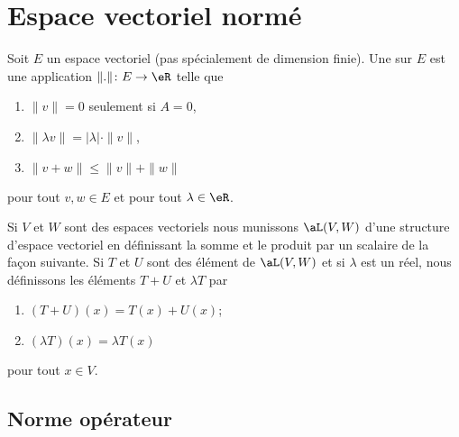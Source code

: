 
\section{Espace vectoriel normé}
\label{SeckwyQjK}

\begin{definition}  \label{DefOYPooZIoWnI}
    Soit \( E\) un espace vectoriel (pas spécialement de dimension finie). Une   sur $E$ est une application $\| . \|\colon E\to \eR$ telle que
    \begin{enumerate}
        \item
            $\| v \|=0$ seulement si $A=0$,
        \item
            $\| \lambda v \|=| \lambda |\cdot\| v \|$,
        \item
            $\| v+w \|\leq\| v \|+\| w \|$

    \end{enumerate}
    pour tout $v,w\in E$ et pour tout $\lambda\in\eR$.
\end{definition}

\begin{definition}  \label{DefDQRooVGbzSm}
    Si \( V\) et \( W\) sont des espaces vectoriels nous munissons \( \aL(V,W)\) d'une structure d'espace vectoriel en définissant la somme et le produit par un scalaire de la façon suivante. Si $T$ et $U$ sont des élément de $\aL(V,W)$ et si $\lambda$ est un réel, nous définissons les éléments $T+U$ et $\lambda T$ par
    \begin{enumerate}
        \item
            $(T+U)(x)=T(x)+U(x)$;
        \item
            $(\lambda T)(x)=\lambda T(x)$
    \end{enumerate}
    pour tout \( x\in V\).
\end{definition}

\subsection{Norme opérateur}


